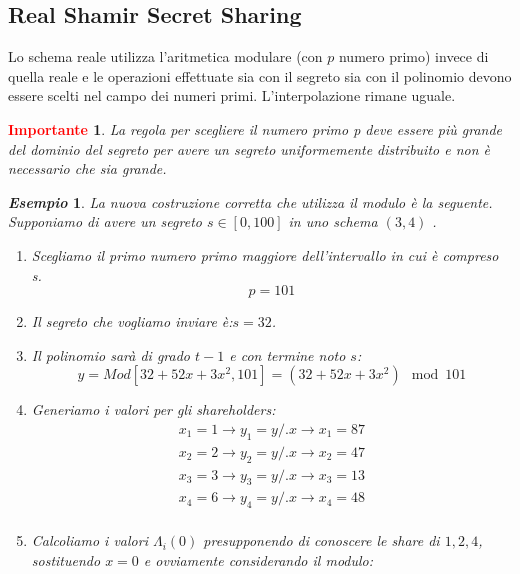 \documentclass{book}
\newtheorem*{Importante}{\textbf{\textcolor{red}{Importante}}}
\newtheorem{esempio}{\emph{Esempio}}
\begin{document}
\subsection{Real Shamir Secret Sharing}
Lo schema reale utilizza l'aritmetica modulare (con \(p\) numero primo) invece di quella reale e  le operazioni effettuate sia con il segreto sia con il polinomio devono essere scelti nel campo dei numeri primi\@.\newline
L'interpolazione rimane uguale\@.
\begin{Importante}
	La regola per scegliere il numero primo p deve essere più grande del dominio del segreto per avere un segreto uniformemente distribuito e non è necessario che sia grande\@.
\end{Importante}
\begin{esempio}
	La nuova costruzione corretta che utilizza il modulo è la seguente\@.\newline
	Supponiamo di avere un segreto \(s\in[0,100]\) in uno schema \((3,4) \) \@.
	\begin{enumerate}
		\item Scegliamo il primo numero primo maggiore dell'intervallo in cui è compreso s\@.
		      \begin{equation*}
			      p=101
		      \end{equation*}
		\item Il segreto che vogliamo inviare è:\@ \(s=32\).
		\item Il polinomio sarà di grado \(t-1\) e con termine noto \(s\):\begin{equation*}
			      y=Mod[32+52x+3x^{2},101]=(32+52x+3x^{2})\mod{101}
		      \end{equation*}
		\item Generiamo i valori per gli shareholders:
		      \begin{equation*}
			      \begin{matrix}
				      x_{1}=1\rightarrow y_{1}=y/.{x\rightarrow x_{1}}=87 \\
				      x_{2}=2\rightarrow y_{2}=y/.{x\rightarrow x_{2}}=47 \\
				      x_{3}=3\rightarrow y_{3}=y/.{x\rightarrow x_{3}}=13 \\
				      x_{4}=6\rightarrow y_{4}=y/.{x\rightarrow x_{4}}=48 \\
			      \end{matrix}
		      \end{equation*}
		\item Calcoliamo i valori \(\Lambda_{i}(0) \) presupponendo di conoscere le share di \(1,2,4\), sostituendo \(x=0\) e ovviamente considerando il modulo:

\end{enumerate}
\end{esempio}
\end{document}
